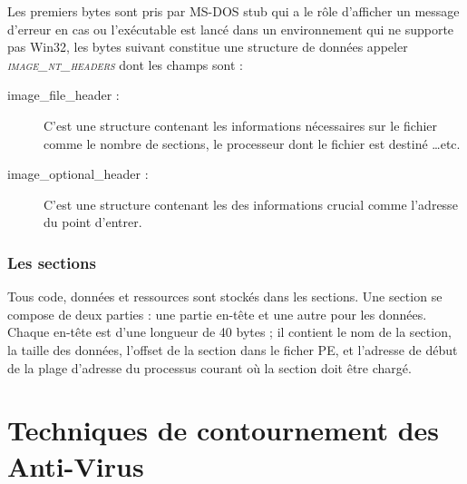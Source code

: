     Les premiers bytes sont pris par MS-DOS stub qui a le rôle d'afficher un message d'erreur en cas ou 
    l'exécutable est lancé dans un environnement qui ne supporte pas Win32, les bytes suivant constitue 
    une structure de données appeler \emph{\textsc{image\_nt\_headers}} dont les champs sont :
    \begin{description}
        \item[image\_file\_header :] C'est une structure contenant les informations nécessaires
            sur le fichier comme le nombre de sections, le processeur dont le fichier est destiné \ldots etc.
        \item[image\_optional\_header :] C'est une structure contenant les des informations crucial comme l'adresse
            du point d'entrer.
    \end{description}

    \subsubsection{Les sections}
    Tous code, données et ressources sont stockés dans les sections. Une section se compose de deux 
    parties : une partie en-tête et une autre pour les données. Chaque en-tête est d'une longueur de 40 
    bytes ; il contient le nom de la section, la taille des données, l'offset de la section dans 
    le ficher PE, et l'adresse de début de la plage d'adresse du processus courant où la section doit être 
    chargé. \cite{pe4}

\section{Techniques de contournement des Anti-Virus}


